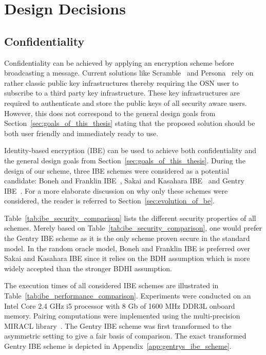 \section{Design Decisions}
\label{sec:design_decisions}
\subsection{Confidentiality}
Confidentiality can be achieved by applying an encryption scheme before broadcasting a message. Current solutions like Scramble~\cite{art:BeatoKW11} and Persona~\cite{art:BadenBSBS09} rely on rather classic public key infrastructures thereby requiring the OSN user to subscribe to a third party key infrastructure. These key infrastructures are required to authenticate and store the public keys of all security aware users. However, this does not correspond to the general design goals from Section~\ref{sec:goals_of_this_thesis} stating that the proposed solution should be both user friendly and immediately ready to use.

Identity-based encryption (IBE) can be used to achieve both confidentiality and the general design goals from Section~\ref{sec:goals_of_this_thesis}. During the design of our scheme, three IBE schemes were considered as a potential candidate: Boneh and Franklin IBE~\cite{art:BonehF01}, Sakai and Kasahara IBE~\cite{art:SakaiK03} and Gentry IBE~\cite{art:Gentry06}. For a more elaborate discussion on why only these schemes were considered, the reader is referred to Section~\ref{sec:evolution_of_be}.

Table~\ref{tab:ibe_security_comparison} lists the different security properties of all schemes. Merely based on Table~\ref{tab:ibe_security_comparison}, one would prefer the Gentry IBE scheme as it is the only scheme proven secure in the standard model. In the random oracle model, Boneh and Franklin IBE is preferred over Sakai and Kasahara IBE since it relies on the BDH assumption which is more widely accepted than the stronger BDHI assumption.

The execution times of all considered IBE schemes are illustrated in Table~\ref{tab:ibe_performance_comparison}. Experiments were conducted on an Intel Core 2.4 GHz i5 processor with 8 Gb of 1600 MHz DDR3L onboard memory. Pairing computations were implemented using the multi-precision MIRACL library~\cite{art:Scott03}. The Gentry IBE scheme was first transformed to the asymmetric setting to give a fair basis of comparison. The exact transformed Gentry IBE scheme is depicted in Appendix~\ref{app:gentrys_ibe_scheme}. 

